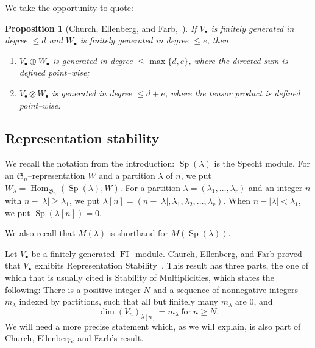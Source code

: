 \documentclass[10pt]{amsart}
\DeclareMathOperator{\FI}{FI}
\DeclareMathOperator{\Hom}{Hom}
\DeclareMathOperator{\Sp}{Sp}
\newcommand{\Sn}{\mathfrak{S}}
\newcommand{\dt}{\bullet}
\newtheorem{proposition}[theorem]{Proposition}
\theoremstyle{definition}
\begin{document}
We take the opportunity to quote:
\begin{proposition}[Church, Ellenberg, and Farb,~\cite{CEF}]\label{tensorgen}
If $V_\dt$ is finitely generated in degree $\leq d$ and $W_\dt$ is finitely generated in degree $\leq e$, then
\begin{enumerate}
\item\label{prop2.7_1} $V_\dt \oplus W_\dt$ is generated in degree $\leq \max\{d,e\}$, where the directed sum is defined point--wise;
\item\label{prop2.7_2} $V_\dt \otimes W_\dt$ is generated in degree $\leq d+e$, where the tensor product is defined point--wise.
\end{enumerate}
\end{proposition}


\subsection{Representation stability} \label{defineLambdaComponent}

We recall the notation from the introduction: $\Sp(\lambda)$ is the Specht module. For an $\Sn_n$--representation $W$ and a partition $\lambda$ of $n$, we put $W_{\lambda} = \Hom_{\Sn_n}(\Sp(\lambda), W)$. For a partition $\lambda=(\lambda_1, \ldots, \lambda_r)$ and an integer $n$ with $n-|\lambda| \geq \lambda_1$, we put $\lambda[n] = (n-|\lambda|, \lambda_1, \lambda_2, \ldots, \lambda_r)$. When $n-|\lambda| < \lambda_1$, we put $\Sp(\lambda[n]) = 0$. 

We also recall that $M(\lambda)$ is shorthand for $M(\Sp(\lambda))$.

Let $V_{\dt}$ be a finitely generated $\FI$--module. Church, Ellenberg, and Farb proved that $V_{\dt}$ exhibits Representation Stability~\cite[Theorem~1.13]{CEF}. This result has three parts, the one of which that is usually cited is Stability of Multiplicities, which states the following: There is a positive integer $N$ and a sequence of nonnegative integers $m_{\lambda}$ indexed by partitions, such that all but finitely many $m_{\lambda}$ are $0$, and
\[ \dim (V_n)_{\lambda[n]} = m_{\lambda} \ \mbox{for}\ n \geq N . \]
We will need a more precise statement which, as we will explain, is also part of Church, Ellenberg, and Farb's result.
\end{document}
